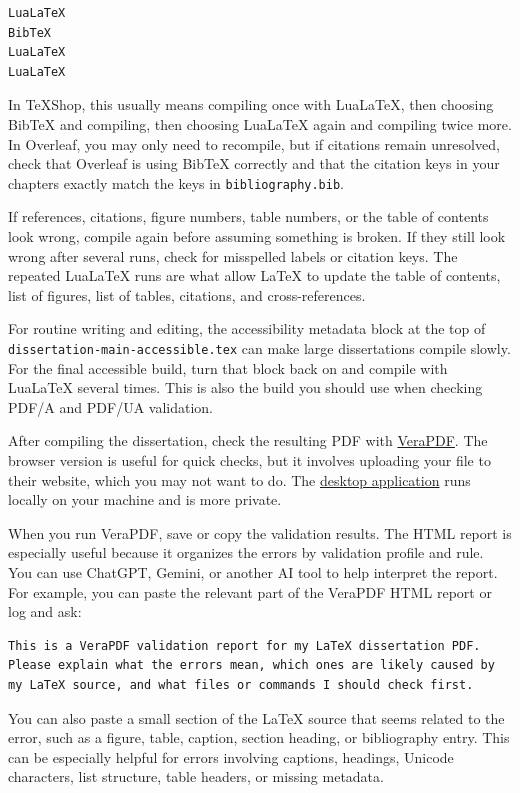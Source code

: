 \begin{acknowledgements}
\begin{verbatim}
LuaLaTeX
BibTeX
LuaLaTeX
LuaLaTeX
\end{verbatim}

In TeXShop, this usually means compiling once with LuaLaTeX, then choosing BibTeX and compiling, then choosing LuaLaTeX again and compiling twice more. In Overleaf, you may only need to recompile, but if citations remain unresolved, check that Overleaf is using BibTeX correctly and that the citation keys in your chapters exactly match the keys in \texttt{bibliography.bib}.

If references, citations, figure numbers, table numbers, or the table of contents look wrong, compile again before assuming something is broken. If they still look wrong after several runs, check for misspelled labels or citation keys. The repeated LuaLaTeX runs are what allow LaTeX to update the table of contents, list of figures, list of tables, citations, and cross-references.

For routine writing and editing, the accessibility metadata block at the top of \texttt{dissertation-main-accessible.tex} can make large dissertations compile slowly. For the final accessible build, turn that block back on and compile with LuaLaTeX several times. This is also the build you should use when checking PDF/A and PDF/UA validation.

After compiling the dissertation, check the resulting PDF with \href{https://dev.verapdf-rest.duallab.com/}{VeraPDF}. The browser version is useful for quick checks, but it involves uploading your file to their website, which you may not want to do. The \href{https://software.verapdf.org/}{desktop application} runs locally on your machine and is more private.

When you run VeraPDF, save or copy the validation results. The HTML report is especially useful because it organizes the errors by validation profile and rule. You can use ChatGPT, Gemini, or another AI tool to help interpret the report. For example, you can paste the relevant part of the VeraPDF HTML report or log and ask:

\begin{verbatim}
This is a VeraPDF validation report for my LaTeX dissertation PDF.
Please explain what the errors mean, which ones are likely caused by
my LaTeX source, and what files or commands I should check first.
\end{verbatim}

You can also paste a small section of the LaTeX source that seems related to the error, such as a figure, table, caption, section heading, or bibliography entry. This can be especially helpful for errors involving captions, headings, Unicode characters, list structure, table headers, or missing metadata.


\end{acknowledgements}
